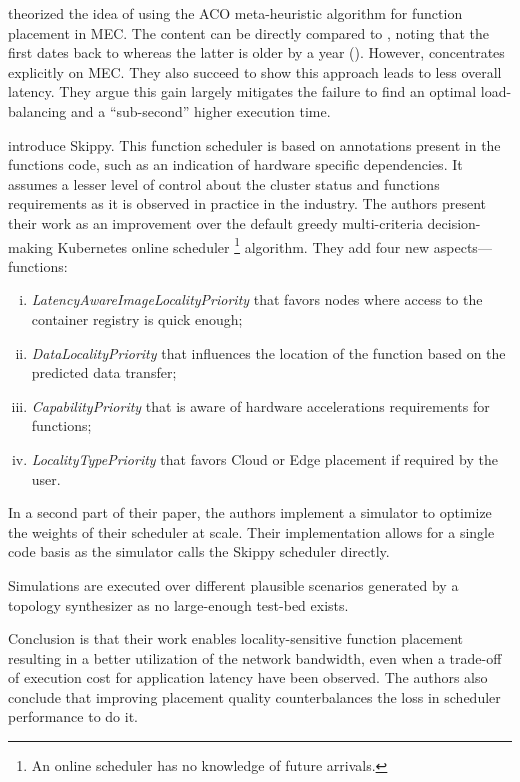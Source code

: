 \begin{description}[leftmargin=10pt]
	\item[\citet{palade_swarm-based_2020}] theorized the idea of using the \gls{ACO} meta-heuristic algorithm for function placement in \gls{MEC}. The content can be directly compared to \cite{mutichiro_qos-based_2021}, noting that the first dates back to  whereas the latter is older by a year (). However, \cite{palade_swarm-based_2020} concentrates explicitly on \gls{MEC}. They also succeed to show this approach leads to less overall latency. They argue this gain largely mitigates the failure to find an optimal load-balancing and a “sub-second” higher execution time.

	\item[\citet{rausch_optimized_2021}] introduce Skippy. This function scheduler is based on annotations present in the functions code, such as an indication of hardware specific dependencies. It assumes a lesser level of control about the cluster status and functions requirements as it is observed in practice in the industry. The authors present their work as an improvement over the default greedy multi-criteria decision-making Kubernetes online scheduler \footnote{An online scheduler has no knowledge of future arrivals.} algorithm. They add four new aspects—functions:
		\begin{enumerate}[(i)]
			\item \emph{LatencyAwareImageLocalityPriority} that favors nodes where access to the container registry is quick enough;
			\item \emph{DataLocalityPriority} that influences the location of the function based on the predicted data transfer;
			\item \emph{CapabilityPriority} that is aware of hardware accelerations requirements for functions;
			\item \emph{LocalityTypePriority} that favors Cloud or Edge placement if required by the user.
		\end{enumerate}

		In a second part of their paper, the authors implement a simulator to optimize the weights of their scheduler at scale. Their implementation allows for a single code basis as the simulator calls the Skippy scheduler directly.

		Simulations are executed over different plausible scenarios generated by a topology synthesizer as no large-enough test-bed exists.

		Conclusion is that their work enables locality-sensitive function placement resulting in a better utilization of the network bandwidth, even when a trade-off of execution cost for application latency have been observed. The authors also conclude that improving placement quality counterbalances the loss in scheduler performance to do it.


\end{description}
